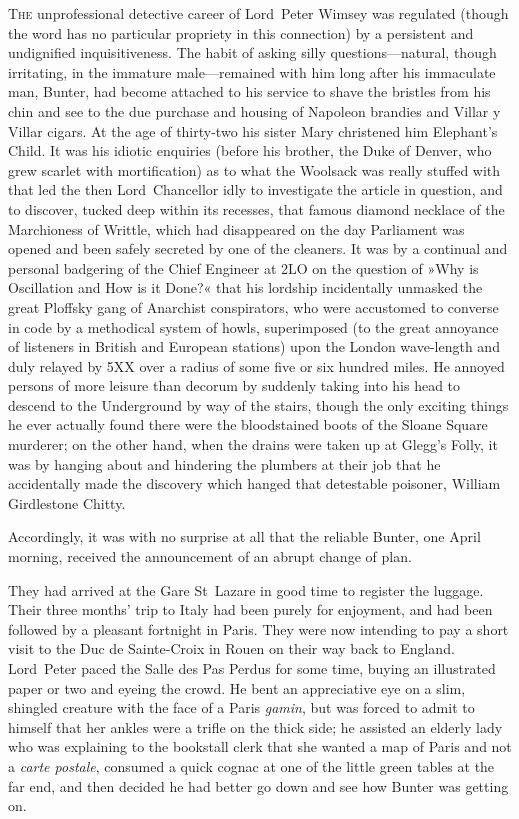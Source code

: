 	
\lettrine[lines=4]{T}{he} unprofessional detective career of Lord~Peter Wimsey was regulated (though the word has no particular propriety in this connection) by a persistent and undignified inquisitiveness. The habit of asking silly questions—natural, though irritating, in the immature male—remained with him long after his immaculate man, Bunter, had become attached to his service to shave the bristles from his chin and see to the due purchase and housing of Napoleon brandies and Villar y Villar cigars. At the age of thirty-two his sister Mary christened him Elephant's Child. It was his idiotic enquiries (before his brother, the Duke of Denver, who grew scarlet with mortification) as to what the Woolsack was really stuffed with that led the then Lord~Chancellor idly to investigate the article in question, and to discover, tucked deep within its recesses, that famous diamond necklace of the Marchioness of Writtle, which had disappeared on the day Parliament was opened and been safely secreted by one of the cleaners. It was by a continual and personal badgering of the Chief Engineer at 2LO on the question of »Why is Oscillation and How is it Done?« that his lordship incidentally unmasked the great Ploffsky gang of Anarchist conspirators, who were accustomed to converse in code by a methodical system of howls, superimposed (to the great annoyance of listeners in British and European stations) upon the London wave-length and duly relayed by 5XX over a radius of some five or six hundred miles. He annoyed persons of more leisure than decorum by suddenly taking into his head to descend to the Underground by way of the stairs, though the only exciting things he ever actually found there were the bloodstained boots of the Sloane Square murderer; on the other hand, when the drains were taken up at Glegg's Folly, it was by hanging about and hindering the plumbers at their job that he accidentally made the discovery which hanged that detestable poisoner, William Girdlestone Chitty.

Accordingly, it was with no surprise at all that the reliable Bunter, one April morning, received the announcement of an abrupt change of plan.

They had arrived at the Gare St~Lazare in good time to register the luggage. Their three months' trip to Italy had been purely for enjoyment, and had been followed by a pleasant fortnight in Paris. They were now intending to pay a short visit to the Duc de Sainte-Croix in Rouen on their way back to England. Lord~Peter paced the Salle des Pas Perdus for some time, buying an illustrated paper or two and eyeing the crowd. He bent an appreciative eye on a slim, shingled creature with the face of a Paris \textit{gamin}, but was forced to admit to himself that her ankles were a trifle on the thick side; he assisted an elderly lady who was explaining to the bookstall clerk that she wanted a map of Paris and not a \textit{carte postale}, consumed a quick cognac at one of the little green tables at the far end, and then decided he had better go down and see how Bunter was getting on.

